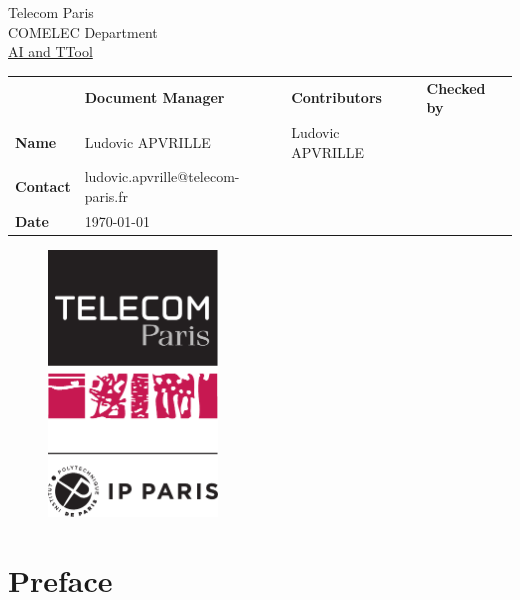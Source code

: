 \documentclass[12pt]{article}
\begin{document}
\sloppy 

\begin{center}
\Large Telecom Paris \\
\Large COMELEC Department \\
\vspace{20 pt}
\underline{\Huge AI and TTool}
\end{center}

\begin{table}[H]
\large
\centering
\begin{adjustbox}{width=\textwidth}
\begin{tabular}{ |p{1.6cm}|p{6.0cm}|p{4.4cm}|p{4.2cm}| }
\hhline{----}
 & \textbf{Document Manager} & \textbf{Contributors}  & \textbf{Checked by}  \\ 
\hhline{----}
\textbf{Name}   & Ludovic APVRILLE & Ludovic APVRILLE &
\multirow{2}{*}{%
} \\
\hhline{--~~}
\textbf{Contact} & ludovic.apvrille@telecom-paris.fr  & \\ 
\hhline{--~~}
\textbf{Date} & \today &  &  \\ 
\hline
\end{tabular}
\end{adjustbox}
\end{table}

\begin{figure}[!h]
\centering
\includegraphics[width=0.4\textwidth]{fig/tp.pdf}
\end{figure}

\newpage
\tableofcontents


\newpage
\section{Preface}
\end{document}

